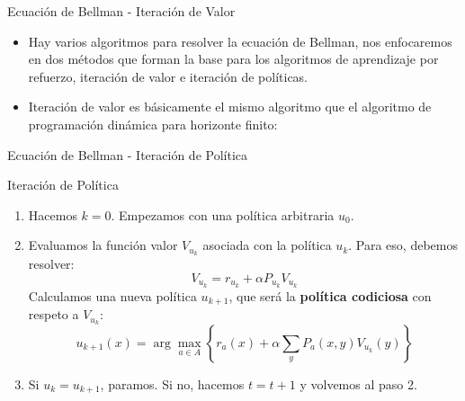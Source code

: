 \documentclass[handout]{beamer}
\begin{document}
\begin{frame}{Ecuación de Bellman - Iteración de Valor} 
\begin{itemize}
\item Hay varios algoritmos para resolver la ecuación de Bellman, nos enfocaremos en dos métodos que forman la base para los algoritmos de aprendizaje por refuerzo, iteración de valor e iteración de políticas.
\item<2-> Iteración de valor es básicamente el mismo algoritmo que el algoritmo de programación dinámica para horizonte finito:
\end{itemize}
\end{frame}

\begin{frame}{Ecuación de Bellman - Iteración de Política}
\begin{block}{Iteración de Política}
\begin{enumerate}
\item Hacemos $k = 0$. Empezamos con una política arbitraria $u_0$.

\item Evaluamos la función valor $V_{u_k}$ asociada con la política $u_k$. Para eso, debemos resolver:
$$
V_{u_k} = r_{u_k} + \alpha P_{u_k} V_{u_k}
$$
Calculamos una nueva política $u_{k+1}$, que será la \textbf{política codiciosa} con respeto a $V_{u_k}$:
$$
u_{k+1}(x) = \arg\max_{a \in A} \left\{r_a(x) + \alpha\sum_y P_a(x,y)V_{u_k}(y)\right\}
$$
\item Si $u_k=u_{k+1}$, paramos. Si no, hacemos $t = t+1$ y volvemos al paso 2.
\end{enumerate}
\end{block}
\end{frame}
\end{document}
